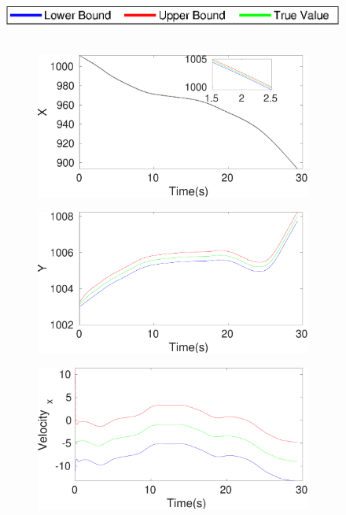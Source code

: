 \begin{figure}[h]
\includegraphics[scale=0.8]{figures/legend}\\\\
\begin{subfigure}{.5\linewidth}
\centering
\includegraphics[width=\linewidth]{figures/Frad/s3pmSMX}
\end{subfigure}
\begin{subfigure}{.5\linewidth}
\centering
\includegraphics[width=\linewidth]{figures/Frad/s3pmSMY}
\end{subfigure}
\begin{subfigure}{.5\linewidth}
\centering
\includegraphics[width=\linewidth]{figures/Frad/s3pmSMVelocity_x}

\end{subfigure}
\end{figure}
